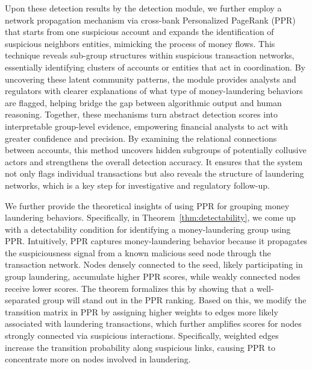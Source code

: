\documentclass[11pt,english]{article}
\begin{document}
Upon these detection results by the detection module, we further employ a network propagation mechanism via cross-bank Personalized PageRank (PPR) that starts from one suspicious account and expands the identification of suspicious neighbors entities, mimicking the process of money flows. This technique reveals sub-group structures within suspicious transaction networks, essentially identifying clusters of accounts or entities that act in coordination. By uncovering these latent community patterns, the module provides analysts and regulators with clearer explanations of what type of money-laundering behaviors are flagged, helping bridge the gap between algorithmic output and human reasoning. 
Together, these mechanisms turn abstract detection scores into interpretable group-level evidence, empowering financial analysts to act with greater confidence and precision. By examining the relational connections between accounts, this method uncovers hidden subgroups of potentially collusive actors and strengthens the overall detection accuracy. It ensures that the system not only flags individual transactions but also reveals the structure of laundering networks, which is a key step for investigative and regulatory follow-up. 

We further provide the theoretical insights of using PPR for grouping money laundering behaviors. Specifically, in Theorem~\ref{thm:detectability}, we come up with a detectability condition for identifying a money-laundering group using PPR. Intuitively, PPR captures money-laundering behavior because it propagates the suspiciousness signal from a known malicious seed node through the transaction network. Nodes densely connected to the seed, likely participating in group laundering, accumulate higher PPR scores, while weakly connected nodes receive lower scores. The theorem formalizes this by showing that a well-separated group will stand out in the PPR ranking. Based on this, we modify the transition matrix in PPR by assigning higher weights to edges more likely associated with laundering transactions, which further amplifies scores for nodes strongly connected via suspicious interactions. Specifically, weighted edges increase the transition probability along suspicious links, causing PPR to concentrate more on nodes involved in laundering.
\end{document}
